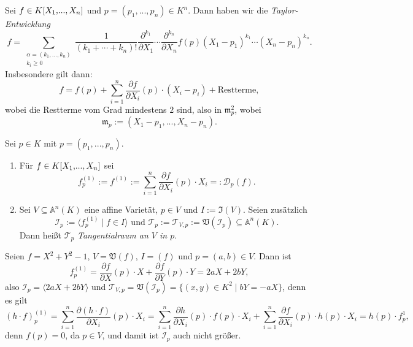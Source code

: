 \documentclass[a4paper,12pt,index=toc]{scrbook}
\theoremstyle{keinenummern} %
\def\A{\mathbb{A}}
\def\V{\mathfrak{V}}
\def\I{\mathfrak{I}}
\def\II{\mathcal{I}}
\newcommand{\DD}{\mathcal{D}} %
\def\T{\mathcal{T}}
\def\m{\mathfrak{m}}
\let\olddotsc\dotsc %
\renewcommand{\dotsc}{\ensuremath{\!...}}
\newcommand{\polyx}[1][n]{\ensuremath%
  [X_{1},\dotsc,X_{#1}]}
\begin{document}
\begin{erinnerung}\label{3.3.1}
Sei $f\in K\polyx$ und $p=(p_{1},\dotsc,p_{n})\in K^{n}$. Dann haben wir die \emph{Taylor-Entwicklung}
\begin{equation*}f=\!\!\!\!\sum_{\substack{\alpha=(k_{1},\olddotsc,k_{n})\\k_{i}\geq 0}}\!\!\frac{1}{(k_{1}+\dotsm+k_{n})!}\frac{\partial^{k_{1}}}{\partial X_{1}}\dotsm\frac{\partial^{k_{n}}}{\partial X_{n}}f(p)(X_{1}-p_{1})^{k_{1}}\dotsm(X_{n}-p_{n})^{k_{n}}.\end{equation*}
Insbesondere gilt dann:
\begin{equation*}f=f(p)+\sum_{i=1}^{n}\frac{\partial f}{\partial X_{i}}(p)\cdot(X_{i}-p_{i})+\text{Restterme},\end{equation*}
wobei die Restterme vom Grad mindestens $2$ sind, also in $\m_{p}^{2}$, wobei
\begin{equation*}\m_{p}:=(X_{1}-p_{1},\dotsc,X_{n}-p_{n}).\end{equation*}
\end{erinnerung}

\begin{dfn}\label{3.3.2}
Sei $p\in K$ mit $p=(p_{1},\dotsc,p_{n})$.
\begin{enumerate}
\item{} Für $f\in K\polyx$ sei
\begin{equation*}f_{p}^{(1)}:=f^{(1)}:=\sum_{i=1}^{n}\frac{\partial f}{\partial X_{i}}(p)\cdot X_{i}=:\DD_{p}(f).\end{equation*}
\item{} Sei $V\subseteq\A^{n}(K)$ eine affine Varietät, $p\in V$ und $I:=\I(V)$. Seien zusätzlich
\begin{equation*}\II_{p}:=\langle f_{p}^{(1)}\mid f\in I\rangle\text{ und }\T_{p}:=\T_{V,p}:=\V(\II_{p})\subseteq\A^{n}(K).\end{equation*}
Dann heißt $\T_{p}$ \emph{Tangentialraum an $V$ in $p$}.
\end{enumerate}\end{dfn}

\begin{bsp}\label{3.3.3}
Seien $f=X^{2}+Y^{2}-1$, $V=\V(f)$, $I=(f)$ und $p=(a,b)\in V$.
Dann ist
\begin{equation*}f_{p}^{(1)}=\frac{\partial f}{\partial X}(p)\cdot X+\frac{\partial f}{\partial Y}(p)\cdot Y=2aX + 2bY,\end{equation*}
also $\II_{p}=\langle 2aX+2bY \rangle$ und $\T_{V,p}=\V(\II_{p})=\{(x,y)\in K^{2}\mid bY=-aX\}$, denn es gilt
\begin{equation*}(h\cdot f)_{p}^{(1)}=\!\!\sum_{i=1}^{n}\frac{\partial(h\cdot f)}{\partial X_{i}}(p)\cdot X_{i}=\!\!\sum_{i=1}^{n}\frac{\partial h}{\partial X_{i}}(p)\cdot f(p)\cdot X_{i}+\sum_{i=1}^{n}\frac{\partial f}{\partial X_{i}}(p)\cdot h(p)\cdot X_{i}=h(p)\cdot f_{p}^{1},\end{equation*}
denn $f(p)=0$, da $p\in V$, und damit ist $\II_{p}$ auch nicht größer.
\end{bsp}
\end{document}
